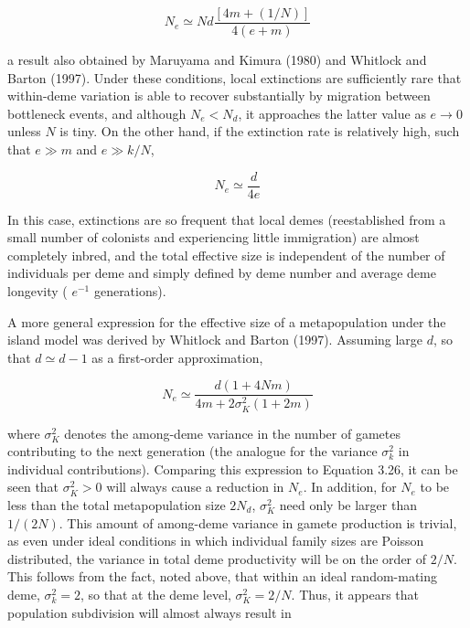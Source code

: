 \documentclass{article}
\begin{document}
\begin{equation}
N_{e}\simeq N d\frac{\left[4m+(1/N)\right]}{4(e+m)}
\tag{3.27a}
\label{eq:3_27a}
\end{equation}

a result also obtained by Maruyama and Kimura (1980) and Whitlock and Barton (1997). Under these conditions, local extinctions are sufficiently rare that within-deme variation is able to recover substantially by migration between bottleneck events, and although  $ N_e < N_d $, it approaches the latter value as  $ e \to 0 $ unless  $ N $ is tiny. On the other hand, if the extinction rate is relatively high, such that  $ e \gg m $ and  $ e \gg k/N $,

\begin{equation}
N_{e}\simeq\frac{d}{4e}
\tag{3.27b}
\label{eq:3_27b}
\end{equation}

In this case, extinctions are so frequent that local demes (reestablished from a small number of colonists and experiencing little immigration) are almost completely inbred, and the total effective size is independent of the number of individuals per deme and simply defined by deme number and average deme longevity ( $ e^{-1} $ generations).

A more general expression for the effective size of a metapopulation under the island model was derived by Whitlock and Barton (1997). Assuming large $d$, so that $d \simeq d - 1$ as a first-order approximation,

\begin{equation}
N_{e}\simeq\frac{d(1+4N m)}{4m+2\sigma_{K}^{2}(1+2m)}
\tag{3.28}
\label{eq:3_28}
\end{equation}

where  $ \sigma_K^2 $ denotes the among-deme variance in the number of gametes contributing to the next generation (the analogue for the variance  $ \sigma_k^2 $ in individual contributions). Comparing this expression to Equation 3.26, it can be seen that  $ \sigma_K^2 > 0 $ will always cause a reduction in  $ N_e $. In addition, for  $ N_e $ to be less than the total metapopulation size  $ 2N_d $,  $ \sigma_K^2 $ need only be larger than  $ 1/(2N) $. This amount of among-deme variance in gamete production is trivial, as even under ideal conditions in which individual family sizes are Poisson distributed, the variance in total deme productivity will be on the order of  $ 2/N $. This follows from the fact, noted above, that within an ideal random-mating deme,  $ \sigma_k^2 = 2 $, so that at the deme level,  $ \sigma_K^2 = 2/N $. Thus, it appears that population subdivision will almost always result in
\end{document}
